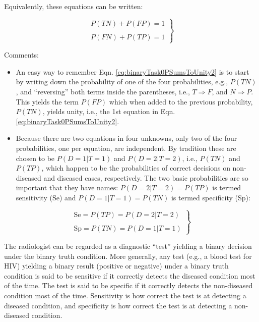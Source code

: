 \documentclass[
]{book}
\providecommand{\tightlist}{%
  \setlength{\itemsep}{0pt}\setlength{\parskip}{0pt}}
\begin{document}
Equivalently, these equations can be written:

\begin{equation} 
\left.\begin{matrix}
P(TN)+P(FP)=1\\ 
\\
P(FN)+P(TP)=1
\end{matrix}\right\}
\label{eq:binaryTask0PSumsToUnity2}
\end{equation}

Comments:

\begin{itemize}
\tightlist
\item
  An easy way to remember Eqn. \eqref{eq:binaryTask0PSumsToUnity2} is to start by writing down the probability of one of the four probabilities, e.g., \(P(TN)\), and ``reversing'' both terms inside the parentheses, i.e., \(T \Rightarrow F\), and \(N \Rightarrow P\). This yields the term \(P(FP)\) which when added to the previous probability, \(P(TN)\), yields unity, i.e., the 1st equation in Eqn. \eqref{eq:binaryTask0PSumsToUnity2}.
\item
  Because there are two equations in four unknowns, only two of the four probabilities, one per equation, are independent. By tradition these are chosen to be \(P(D=1|T=1)\) and \(P(D=2|T=2)\), i.e., \(P(TN)\) and \(P(TP)\), which happen to be the probabilities of correct decisions on non-diseased and diseased cases, respectively. The two basic probabilities are so important that they have names: \(P(D=2|T=2)=P(TP)\) is termed sensitivity (Se) and \(P(D=1|T=1)=P(TN)\) is termed specificity (Sp):
\end{itemize}

\begin{equation} 
\left.\begin{matrix}
\text{Se}=P(TP)=P(D=2|T=2)\\ 
\\
\text{Sp}=P(TN)=P(D=1|T=1)
\end{matrix}\right\}
\label{eq:binaryTask0SeSp}
\end{equation}

The radiologist can be regarded as a diagnostic ``test'' yielding a binary decision under the binary truth condition. More generally, any test (e.g., a blood test for HIV) yielding a binary result (positive or negative) under a binary truth condition is said to be sensitive if it correctly detects the diseased condition most of the time. The test is said to be specific if it correctly detects the non-diseased condition most of the time. Sensitivity is how correct the test is at detecting a diseased condition, and specificity is how correct the test is at detecting a non-diseased condition.
\end{document}
